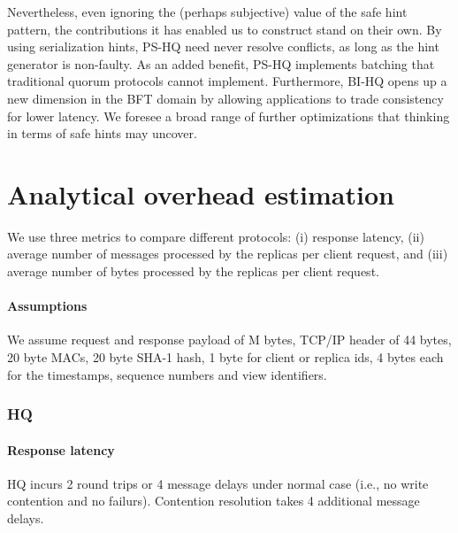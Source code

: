 \documentclass[twocolumn,10pt]{article}
\begin{document}
Nevertheless, even ignoring the (perhaps subjective) value of the safe
hint pattern, the contributions it has enabled us to construct stand on
their own.  By using serialization hints, PS-HQ need never resolve conflicts, as long
as the hint generator is non-faulty. As an added benefit, PS-HQ
implements batching that traditional quorum protocols cannot
implement. Furthermore, BI-HQ opens up a new dimension in the BFT domain
by allowing applications to trade consistency for lower latency. We
foresee a broad range of further optimizations that thinking in terms of safe
hints may uncover. 






\appendix






\section{Analytical overhead estimation}
We use three metrics to compare different protocols: (i) response latency,
(ii) average number of messages processed by the replicas per client request, and (iii) 
average number of bytes processed by the replicas per client request.


\paragraph{Assumptions} We assume request and response payload of M bytes, TCP/IP header of 
44 bytes,
20 byte MACs, 20 byte SHA-1 hash, 1 byte for client or replica ids, 4 bytes each for
the timestamps, sequence numbers and view identifiers.

\subsubsection{HQ}
\paragraph{Response latency}
HQ incurs 2 round trips or 4 message delays under normal case (i.e., no write contention and no
failurs). Contention resolution takes 4 additional message delays. 
\end{document}
